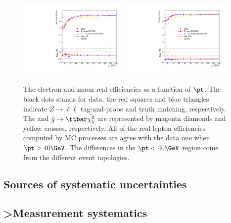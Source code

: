 \begin{figure}[htbp]
\includegraphics[width=0.48\textwidth]{real_efficiency_ratio_plot_electron_pt_ttbar_gtt.pdf}
\includegraphics[width=0.48\textwidth]{real_efficiency_ratio_plot_muon_pt_ttbar_gtt.pdf}
\caption{
The electron and muon real efficiencies as a function of $\pt$.
The black dots stands for data, the red squares and blue triangles indicate $Z\to\ell\ell$ tag-and-probe and truth matching, respectively.
The \ttbar and $\tilde{g}\to\ttbar\tilde{\chi^{0}_{1}}$ are represented by magenta diamonds and yellow crosses, respectively.
All of the real lepton efficiencies computed by MC processes are agree with the data one when $\pt>40 \GeV$.
The differences in the $\pt<40 \GeV$ region come from the different event topologies. 
}
\label{fig:RLE_real_efficiency_ttbar_gtt}
\end{figure}

\subsection{Sources of systematic uncertainties}
\label{subsec:RLE_sources_of_systematic_uncertainties}

\subsection{>Measurement systematics}
\label{subsubsec:RLE_bkg_systematics}

